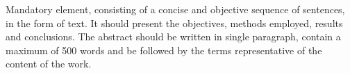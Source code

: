 
\noindent%
Mandatory element, consisting of a concise and objective sequence of sentences, in the form of text. It should present the objectives, methods employed, results and conclusions. The abstract should be written in single paragraph, contain a maximum of 500 words and be followed by the terms representative of the content of the work. \lipsum[2]